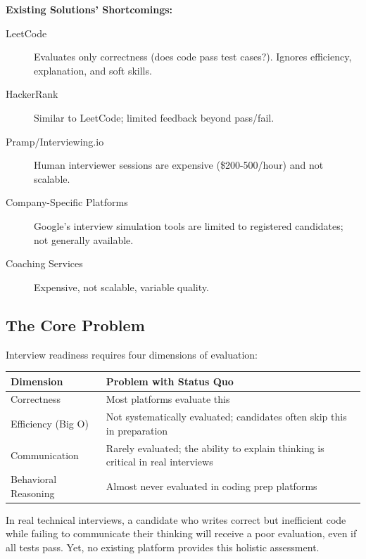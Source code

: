 \documentclass[12pt,a4paper,oneside]{article}
\begin{document}
\begin{cautionbox}
\textbf{Existing Solutions' Shortcomings:}

\begin{description}
    \item[LeetCode] Evaluates only correctness (does code pass test cases?). Ignores efficiency, explanation, and soft skills.
    \item[HackerRank] Similar to LeetCode; limited feedback beyond pass/fail.
    \item[Pramp/Interviewing.io] Human interviewer sessions are expensive (\$200-500/hour) and not scalable.
    \item[Company-Specific Platforms] Google's interview simulation tools are limited to registered candidates; not generally available.
    \item[Coaching Services] Expensive, not scalable, variable quality.
\end{description}
\end{cautionbox}

\subsection{The Core Problem}

Interview readiness requires four dimensions of evaluation:

\begin{table}[H]
\centering
\begin{tabular}{|p{3cm}|p{10cm}|}
\hline
\textbf{Dimension} & \textbf{Problem with Status Quo} \\
\hline
Correctness & Most platforms evaluate this \\
\hline
Efficiency (Big O) & Not systematically evaluated; candidates often skip this in preparation \\
\hline
Communication & Rarely evaluated; the ability to explain thinking is critical in real interviews \\
\hline
Behavioral Reasoning & Almost never evaluated in coding prep platforms \\
\hline
\end{tabular}
\end{table}

In real technical interviews, a candidate who writes correct but inefficient code while failing to communicate their thinking will receive a poor evaluation, even if all tests pass. Yet, no existing platform provides this holistic assessment.
\end{document}
